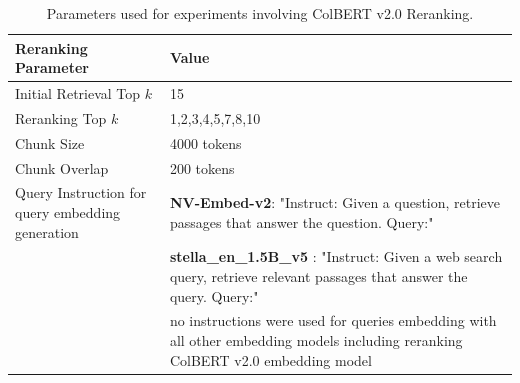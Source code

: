 \documentclass{scrartcl}
\begin{document}
\begin{table}[H]
\centering
\begin{tabular}{|p{5cm}|p{10cm}|}
\hline
\textbf{Reranking Parameter} & \textbf{Value} \\
\hline
Initial Retrieval Top $k$ & 15 \\
Reranking Top $k$ & 1,2,3,4,5,7,8,10 \\
Chunk Size & 4000 tokens \\
Chunk Overlap & 200 tokens \\
Query Instruction for query embedding generation & \textbf{NV-Embed-v2}: "Instruct: Given a question, retrieve passages that answer the question. Query:" \\ 
~ & \textbf{stella\_en\_1.5B\_v5 }: "Instruct: Given a web search query, retrieve relevant passages that answer the query. Query:" \\
~ & no instructions were used for queries embedding with all other embedding models including reranking ColBERT v2.0 embedding model \\
\hline
\end{tabular}
\caption{Parameters used for experiments involving ColBERT v2.0 Reranking.}
\label{table:rerank_params}
\end{table}
\end{document}
